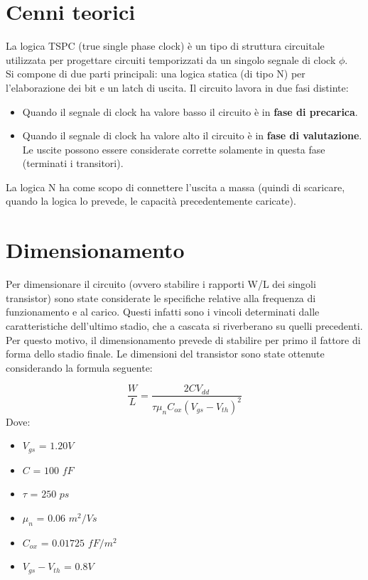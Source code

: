 \documentclass[12pt]{article} %
\begin{document}
\section{Cenni teorici}
La logica TSPC (true single phase clock) è un tipo di struttura circuitale utilizzata per progettare circuiti temporizzati da un singolo segnale di clock $\phi$. \\
Si compone di due parti principali: una logica statica (di tipo N) per l'elaborazione dei bit e un latch di uscita.
Il circuito lavora in due fasi distinte:
\begin{itemize}
\item Quando il segnale di clock ha valore basso il circuito è in \textbf{fase di precarica}.
\item Quando il segnale di clock ha valore alto il circuito è in \textbf{fase di valutazione}. Le uscite possono essere considerate corrette solamente in questa fase (terminati i transitori).
\end{itemize}
La logica N ha come scopo di connettere l'uscita a massa (quindi di scaricare, quando la logica lo prevede, le capacità precedentemente caricate).

\clearpage
\section{Dimensionamento}
Per dimensionare il circuito (ovvero stabilire i rapporti W/L dei singoli transistor) sono state considerate le specifiche relative alla frequenza di funzionamento e al carico. Questi infatti sono i vincoli determinati dalle caratteristiche dell'ultimo stadio, che a cascata si riverberano su quelli precedenti. 
Per questo motivo, il dimensionamento prevede di stabilire per primo il fattore di forma dello stadio finale.
Le dimensioni del transistor sono state ottenute considerando la formula seguente:

\begin{equation} 
\frac{W}{L}=\frac{2CV_{dd}}{\tau \mu_{n}C_{ox}(V_{gs}-V_{th})^2}
\end{equation}
Dove:

\begin{itemize}
\item $V_{gs}$ = $1.20V$ 
\item $C$ = $100$ $fF$ 
\item $\tau$ = $250$ $ps$
\item $\mu_{n}$ = $0.06$ $m^2/Vs$  
\item $C_{ox}$ = $0.01725$ $fF/m^2$ 
\item $V_{gs} - V_{th}$ = $0.8V$ 
\end{itemize}
\end{document}
